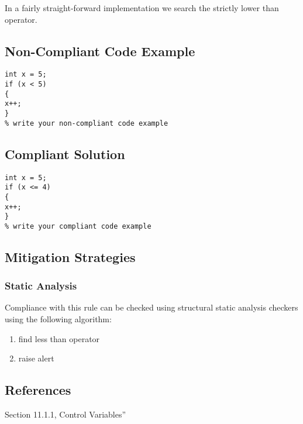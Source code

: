    In a fairly straight-forward implementation we search the strictly
   lower than operator.  

\subsection{Non-Compliant Code Example}



\begin{verbatim}
int x = 5;
if (x < 5)
{
x++;
}
% write your non-compliant code example

\end{verbatim}

\subsection{Compliant Solution}


\begin{verbatim}
int x = 5;
if (x <= 4)
{
x++;
}
% write your compliant code example

\end{verbatim}

\subsection{Mitigation Strategies}
\subsubsection{Static Analysis} 

Compliance with this rule can be checked using structural static analysis checkers using the following algorithm:

\begin{enumerate}
\item find less than operator 
\item raise alert 
\end{enumerate}

\subsection{References}

 Section 11.1.1,
Control Variables''
